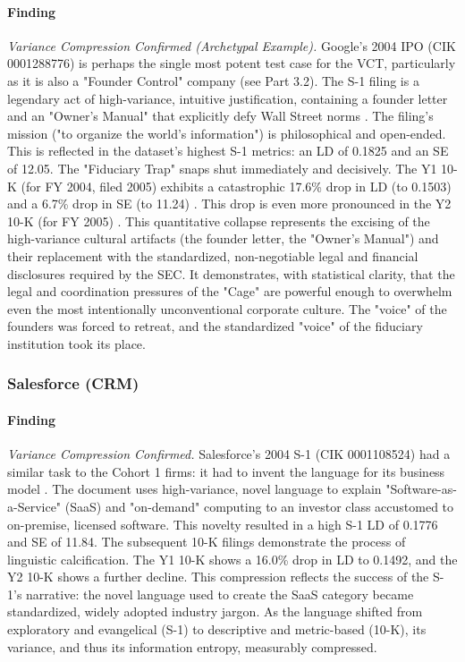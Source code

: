 \documentclass[12pt, letterpaper]{article}
\begin{document}
\paragraph{Finding} \textit{Variance Compression Confirmed (Archetypal Example).}
Google's 2004 IPO (CIK 0001288776) is perhaps the single most potent test case for the VCT, particularly as it is also a "Founder Control" company (see Part 3.2). The S-1 filing is a legendary act of high-variance, intuitive justification, containing a founder letter and an "Owner's Manual" that explicitly defy Wall Street norms \cite{key2}. The filing's mission ("to organize the world's information") is philosophical and open-ended. This is reflected in the dataset's highest S-1 metrics: an LD of 0.1825 and an SE of 12.05. The "Fiduciary Trap" snaps shut immediately and decisively. The Y1 10-K (for FY 2004, filed 2005) exhibits a catastrophic 17.6\% drop in LD (to 0.1503) and a 6.7\% drop in SE (to 11.24) \cite{key29}. This drop is even more pronounced in the Y2 10-K (for FY 2005) \cite{key30}. This quantitative collapse represents the excising of the high-variance cultural artifacts (the founder letter, the "Owner's Manual") and their replacement with the standardized, non-negotiable legal and financial disclosures required by the SEC. It demonstrates, with statistical clarity, that the legal and coordination pressures of the "Cage" are powerful enough to overwhelm even the most intentionally unconventional corporate culture. The "voice" of the founders was forced to retreat, and the standardized "voice" of the fiduciary institution took its place.

\subsubsection{Salesforce (CRM)}
\paragraph{Finding} \textit{Variance Compression Confirmed.}
Salesforce's 2004 S-1 (CIK 0001108524) had a similar task to the Cohort 1 firms: it had to invent the language for its business model \cite{key9}. The document uses high-variance, novel language to explain "Software-as-a-Service" (SaaS) and "on-demand" computing to an investor class accustomed to on-premise, licensed software. This novelty resulted in a high S-1 LD of 0.1776 and SE of 11.84. The subsequent 10-K filings demonstrate the process of linguistic calcification. The Y1 10-K shows a 16.0\% drop in LD to 0.1492, and the Y2 10-K shows a further decline. This compression reflects the success of the S-1's narrative: the novel language used to create the SaaS category became standardized, widely adopted industry jargon. As the language shifted from exploratory and evangelical (S-1) to descriptive and metric-based (10-K), its variance, and thus its information entropy, measurably compressed.
\end{document}
